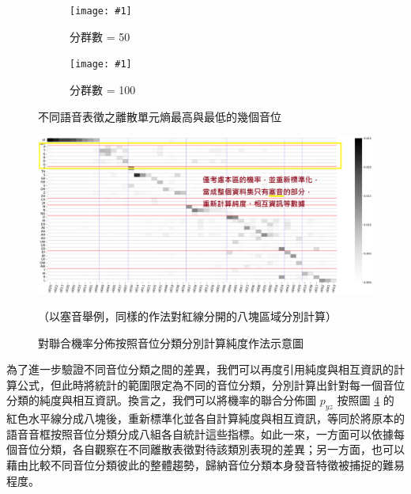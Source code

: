 {

\newcommand{\jeffheightt}[1]{\texttt{[image: \#1]}}

\begin{figure}
     \centering
     \begin{subfigure}{\textwidth}  %
         \centering
         \jeffheightt{figures/phnrank50.png}
         \caption{分群數 = 50}
         \label{fig:phn-specials-clu50}
     \end{subfigure}
     \vfill

     \begin{subfigure}{\textwidth}  %
         \centering
         \jeffheightt{figures/phnrank100.png}
         \caption{分群數 = 100}
         \label{fig:phn-specials-clu100}
     \end{subfigure}

     \caption{不同語音表徵之離散單元熵最高與最低的幾個音位}
     \label{fig:phn-specials}
\end{figure}

}



\begin{figure}
    \centering
    \includegraphics[width=1\linewidth]{figures/better-demo-splitter.png}
    \caption{對聯合機率分佈按照音位分類分別計算純度作法示意圖}
    （以塞音舉例，同樣的作法對紅線分開的八塊區域分別計算）
    \label{fig:demo-splitter}
\end{figure}


為了進一步驗證不同音位分類之間的差異，我們可以再度引用純度與相互資訊的計算公式，但此時將統計的範圍限定為不同的音位分類，分別計算出針對每一個音位分類的純度與相互資訊。換言之，我們可以將機率的聯合分佈圖 $p_{yz}$ 按照圖 \ref{fig:demo-splitter} 的紅色水平線分成八塊後，重新標準化並各自計算純度與相互資訊，等同於將原本的語音音框按照音位分類分成八組各自統計這些指標。如此一來，一方面可以依據每個音位分類，各自觀察在不同離散表徵對待該類別表現的差異；另一方面，也可以藉由比較不同音位分類彼此的整體趨勢，歸納音位分類本身發音特徵被捕捉的難易程度。

